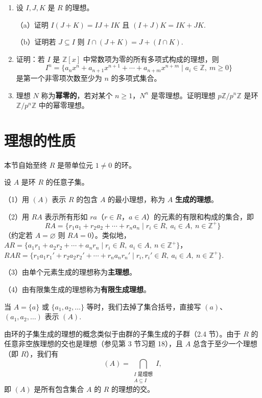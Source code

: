 \begin{enumerate}
\item 设 \(I, J, K\) 是 \(R\) 的理想。

（a）证明 \(I(J+K) = IJ+IK\) 且 \((I+J)K = IK+JK\).

（b）证明若 \(J \subseteq I\) 则 \(I \cap (J+K) = J + (I \cap K)\).

\item 证明：若 \(I\) 是 \(\mathbb{Z}[x]\) 中常数项为零的所有多项式构成的理想，则
\[
I^n = \{a_nx^n + a_{n+1}x^{n+1} + \cdots + a_{n+m}x^{n+m} \mid a_i \in \mathbb{Z},\ m \geq 0\}
\]
是第一个非零项次数至少为 \(n\) 的多项式集合。

\item 理想 \(N\) 称为\textbf{幂零的}，若对某个 \(n \geq 1\)，\(N^n\) 是零理想。证明理想 \(p\mathbb{Z}/p^n\mathbb{Z}\) 是环 \(\mathbb{Z}/p^n\mathbb{Z}\) 中的幂零理想。
\end{enumerate}

\section{理想的性质}

本节自始至终 \(R\) 是带单位元 \(1 \neq 0\) 的环。

\begin{definition}
设 \(A\) 是环 \(R\) 的任意子集。

（1）用 \((A)\) 表示 \(R\) 的包含 \(A\) 的最小理想，称为 \(A\) \textbf{生成的理想}。

（2）用 \(RA\) 表示所有形如 \(ra\)（\(r \in R\)，\(a \in A\)）的元素的有限和构成的集合，即
\[
RA = \{r_1a_1 + r_2a_2 + \cdots + r_na_n \mid r_i \in R,\ a_i \in A,\ n \in \mathbb{Z}^+\}
\]
（约定若 \(A = \varnothing\) 则 \(RA = 0\)）。类似地，\(AR = \{a_1r_1 + a_2r_2 + \cdots + a_nr_n \mid r_i \in R,\ a_i \in A,\ n \in \mathbb{Z}^+\}\)，\(RAR = \{r_1a_1r_1' + r_2a_2r_2' + \cdots + r_na_nr_n' \mid r_i, r_i' \in R,\ a_i \in A,\ n \in \mathbb{Z}^+\}\).

（3）由单个元素生成的理想称为\textbf{主理想}。

（4）由有限集生成的理想称为\textbf{有限生成理想}。
\end{definition}

当 \(A = \{a\}\) 或 \(\{a_1, a_2, \ldots\}\) 等时，我们去掉了集合括号，直接写 \((a)\)、\((a_1, a_2, \ldots)\) 表示 \((A)\).

由环的子集生成的理想的概念类似于由群的子集生成的子群（2.4 节）。由于 \(R\) 的任意非空族理想的交也是理想（参见第 3 节习题 18），且 \(A\) 总含于至少一个理想（即 \(R\)），我们有
\[
(A) = \bigcap_{\substack{I \text{ 是理想} \\ A \subseteq I}} I,
\]
即 \((A)\) 是所有包含集合 \(A\) 的 \(R\) 的理想的交。

